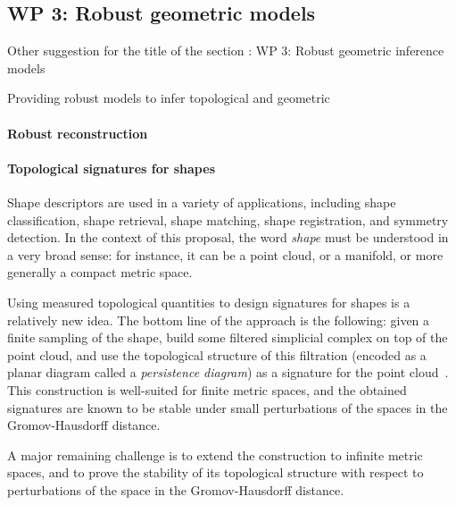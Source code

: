 \subsection*{WP 3:  Robust geometric models} 

Other suggestion for the title of the section : WP 3:  Robust geometric inference models


Providing robust models to infer topological and geometric 







\paragraph{Robust reconstruction}



\paragraph{Topological signatures for shapes}

Shape descriptors are used in a variety of applications, including
shape classification, shape retrieval, shape matching, shape
registration, and symmetry detection. In the context of this proposal,
the word {\em shape} must be understood in a very broad sense: for
instance, it can be a point cloud, or a
manifold, or more generally a compact metric space.

Using measured topological quantities to design signatures for shapes
is a relatively new idea. The bottom line of the approach is the
following: given a finite sampling of the shape, build some filtered
simplicial complex on top of the point cloud, and use the topological
structure of this filtration (encoded as a planar diagram called a
{\em persistence diagram}) as a signature for the point
cloud~\cite{ccgmo-ghsssp-09, sog-hks-09}. This construction is
well-suited for finite metric spaces, and the obtained signatures are
known to be stable under small perturbations of the spaces in the
Gromov-Hausdorff distance.  

A major remaining challenge is to extend the
construction to infinite metric spaces, and to prove the stability of
its topological structure with respect to perturbations of the space
in the Gromov-Hausdorff distance.


